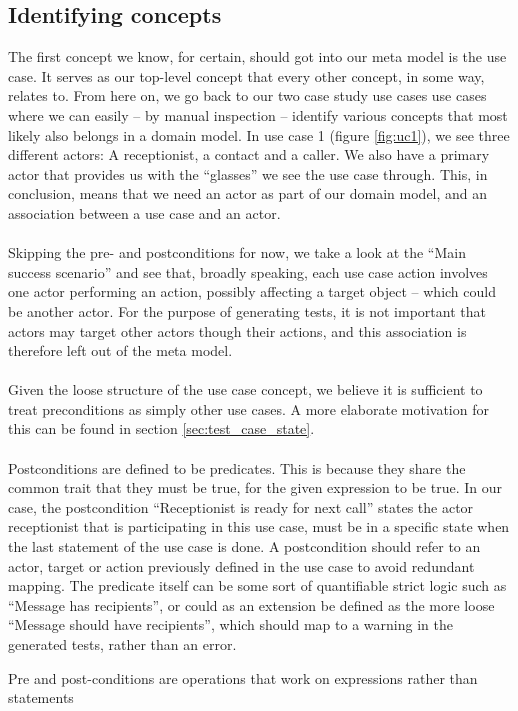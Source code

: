 \subsection{Identifying concepts}
The first concept we know, for certain, should got into our meta model is the use case. It serves as our top-level concept that every other concept, in some way, relates to. From here on, we go back to our two case study use cases use cases where we can easily -- by manual inspection -- identify various concepts that most likely also belongs in a domain model. In use case 1 (figure \ref{fig:uc1}), we see three different actors: A receptionist, a contact and a caller. We also have a primary actor that provides us with the ``glasses'' we see the use case through. This, in conclusion, means that we need an actor as part of our domain model, and an association between a use case and an actor.\\\\
Skipping the pre- and postconditions for now, we take a look at the ``Main success scenario'' and see that, broadly speaking, each use case action involves one actor performing an action, possibly affecting a target object -- which could be another actor. For the purpose of generating tests, it is not important that actors may target other actors though their actions, and this association is therefore left out of the meta model.\\\\
Given the loose structure of the use case concept, we believe it is sufficient to treat preconditions as simply other use cases. A more elaborate motivation for this can be found in section \ref{sec:test_case_state}.\\\\
Postconditions are defined to be predicates. This is because they share the common trait that they must be true, for the given expression to be true. In our case, the postcondition ``Receptionist is ready for next call'' states the actor receptionist that is participating in this use case, must be in a specific state when the last statement of the use case is done. A postcondition should refer to an actor, target or action previously defined in the use case to avoid redundant mapping. The predicate itself can be some sort of quantifiable strict logic such as ``Message has recipients'', or could as an extension be defined as the more loose ``Message should have recipients'', which should map to a warning in the generated tests, rather than an error.

Pre and post-conditions are operations that work on expressions rather than statements

